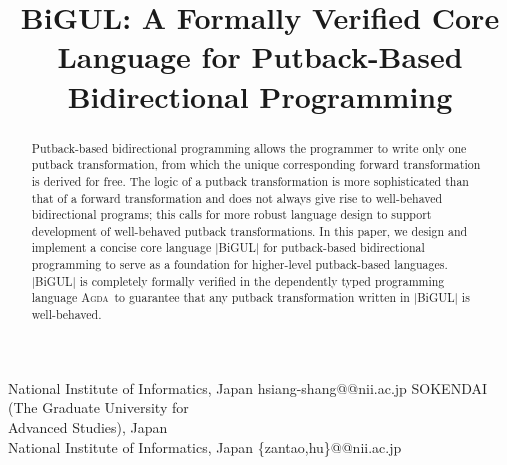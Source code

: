 \documentclass{sigplanconf}
\newcommand{\Agda}{\textsc{Agda}}
\begin{document}



\exclusivelicense                 %



\title{BiGUL: A Formally Verified Core Language for Putback-Based Bidirectional Programming}

           {National Institute of Informatics, Japan}
           {hsiang-shang@@nii.ac.jp}
           {SOKENDAI (The Graduate University for\\ Advanced Studies), Japan\\ National Institute of Informatics, Japan}
           {\{zantao,hu\}@@nii.ac.jp}

\maketitle

\begin{abstract}

Putback-based bidirectional programming allows the programmer to write only one putback transformation, from which the unique corresponding forward transformation is derived for free.
The logic of a putback transformation is more sophisticated than that of a forward transformation and does not always give rise to well-behaved bidirectional programs; this calls for more robust language design to support development of well-behaved putback transformations.
In this paper, we design and implement a concise core language |BiGUL| for putback-based bidirectional programming to serve as a foundation for higher-level putback-based languages.
|BiGUL| is completely formally verified in the dependently typed programming language \Agda\ to guarantee that any putback transformation written in |BiGUL| is well-behaved.

\end{abstract}
\end{document}

